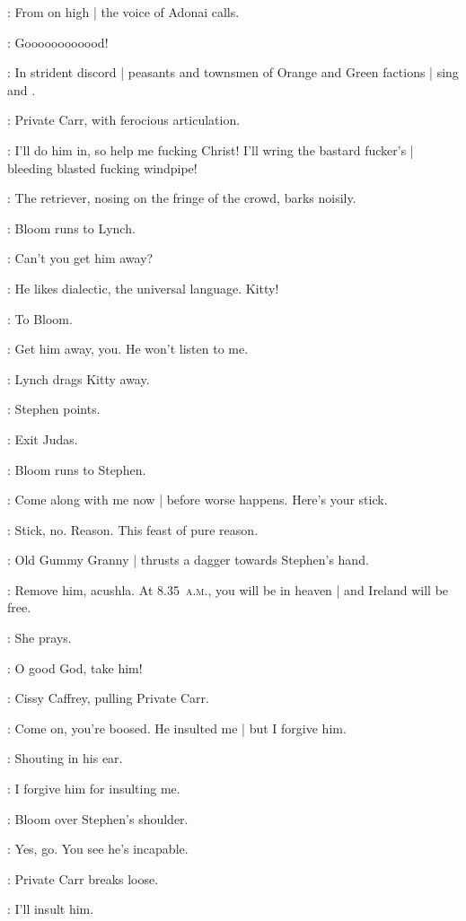 :
From on high |
the voice of Adonai calls.

\Adonai:
Goooooooooood!

:
In strident discord |
peasants and townsmen of Orange and Green factions |
sing 
and .

:
Private Carr,
with ferocious articulation.

\Carr:
I'll do him in,
so help me fucking Christ!
I'll wring the bastard fucker's |
bleeding blasted fucking windpipe!

:
The retriever,
nosing on the fringe of the crowd,
barks noisily.

:
Bloom runs to Lynch.

\Bloom:
Can't you get him away?

\Lynch:
He likes dialectic,
the universal language.
Kitty!

:
To Bloom.

\Lynch:
Get him away,
you.
He won't listen to me.

:
Lynch drags Kitty away.

:
Stephen points.

\Stephen:
Exit Judas.

:
Bloom runs to Stephen.

\Bloom:
Come along with me now |
before worse happens.
Here's your stick.

\Stephen:
Stick,
no.
Reason.
This feast of pure reason.

:
Old Gummy Granny |
thrusts a dagger towards Stephen's hand.

\GummyGranny:
Remove him,
acushla.
At 8.35~\textsc{a.m.},
you will be in heaven |
and Ireland will be free.

:
She prays.

\GummyGranny:
O good God,
take him!

:
Cissy Caffrey,
pulling Private Carr.

\Cissy:
Come on,
you're boosed.
He insulted me |
but I forgive him.

:
Shouting in his ear.

\Cissy:
I forgive him for insulting me.

:
Bloom over Stephen's shoulder.

\Bloom:
Yes,
go.
You see he's incapable.

:
Private Carr breaks loose.

\Carr:
I'll insult him.

